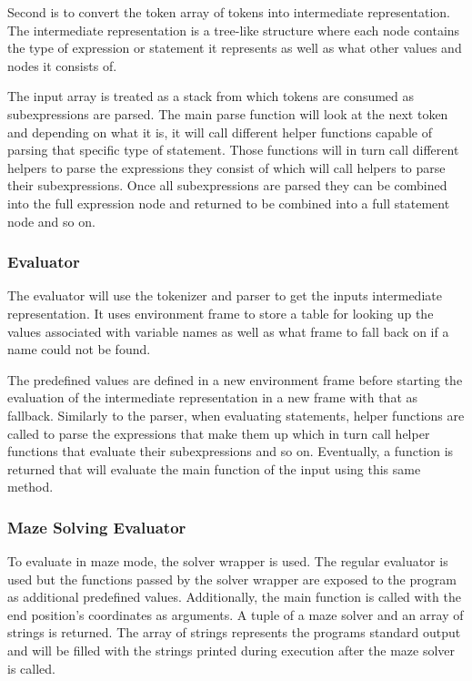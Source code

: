 Second is to convert the token array of tokens into intermediate representation. The intermediate representation is a tree-like structure where each node contains the type of expression or statement it represents as well as what other values and nodes it consists of.

The input array is treated as a stack from which tokens are consumed as subexpressions are parsed. The main parse function will look at the next token and depending on what it is, it will call different helper functions capable of parsing that specific type of statement. Those functions will in turn call different helpers to parse the expressions they consist of which will call helpers to parse their subexpressions. Once all subexpressions are parsed they can be combined into the full expression node and returned to be combined into a full statement node and so on.

\subsubsection{Evaluator}

The evaluator will use the tokenizer and parser to get the inputs intermediate representation. It uses environment frame to store a table for looking up the values associated with variable names as well as what frame to fall back on if a name could not be found.

The predefined values are defined in a new environment frame before starting the evaluation of the intermediate representation in a new frame with that as fallback. Similarly to the parser, when evaluating statements, helper functions are called to parse the expressions that make them up which in turn call helper functions that evaluate their subexpressions and so on. Eventually, a function is returned that will evaluate the main function of the input using this same method.

\subsubsection{Maze Solving Evaluator}

To evaluate in maze mode, the solver wrapper is used. The regular evaluator is used but the functions passed by the solver wrapper are exposed to the program as additional predefined values. Additionally, the main function is called with the end position's coordinates as arguments. A tuple of a maze solver and an array of strings is returned. The array of strings represents the programs standard output and will be filled with the strings printed during execution after the maze solver is called.
